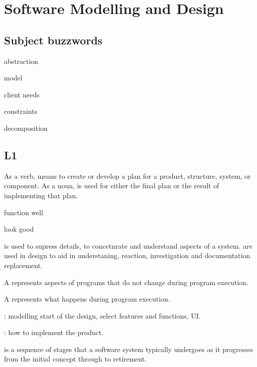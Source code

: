 \section{Software Modelling and Design}
\subsection{Subject buzzwords}
\begin{compactitem}
\item abstraction
\item model
\item client needs 
\item constraints
\item decomposition
\item 
\end{compactitem}

\subsection{L1}
\begin{compactitem}
\item As a verb,  means to create or develop a plan for a product, structure, system, or component. As a noun,  is used for either the final plan or the result of implementing that plan. 

\item {}
\begin{compactitem}
\item function well
\item look good
\end{compactitem}

\item {} is used to supress details, to concetnrate and understand aspects of a system.  are used in design to aid in understaning, reaction, investigation and documentation replacement. 

\item A  represents aspects of programs that do not
change during program execution. 

\item A  represents what happens during program
execution. 

\item {}: modelling start of the design, select features and functions, UI.

\item {}: how to implement the product.

\item {}
is a sequence of stages that a software
system typically undergoes as it progresses from the initial
concept through to retirement.
\end{compactitem}

